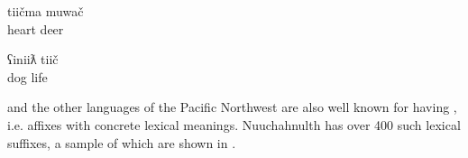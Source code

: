 \begin{exe}

  \ex\label{ex:3.4}

  \begin{xlist}

    \ex\label{ex:3.4a}
    \gll tiičma muwač\\
         heart  deer\\

    \ex\label{ex:3.4b}
    \gll ʕiniiƛ tiič\\
         dog    life\\

  \end{xlist}

\end{exe}

\noindent {} and the other languages of the Pacific Northwest are also well known for having , i.e. affixes with concrete lexical meanings. Nuuchahnulth has over 400 such lexical suffixes, a sample of which are shown in .

\clearpage

